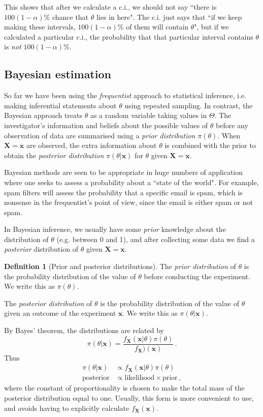 \documentclass[a4paper,11pt]{article}
\theoremstyle{definition}
\newtheorem*{defn}{Definition}
\numberwithin{equation}{section}
\begin{document}
This shows that after we calculate a c.i., we should not say ``there is $100(1-\alpha)\%$ chance that $\theta$ lies in here". The c.i. just says that ``if we keep making these intervals, $100(1-\alpha)\%$ of them will contain $\theta$", but if we calculated a particular c.i., the probability that that particular interval contains $\theta$ is \emph{not} $100(1-\alpha)\%$.

\subsection{Bayesian estimation}
So far we have been using the \emph{frequentist} approach to statistical inference, i.e. making inferential statements about $\theta$ using repeated sampling. In contrast, the Bayesian approach treats $\theta$ as a random variable taking values in $\Theta$. The investigator's information and beliefs about the possible values of $\theta$ before any observation of data are summarised using a \emph{prior distribution} $\pi(\theta)$. When $\mathbf{X}=\mathbf{x}$ are observed, the extra information about $\theta$ is combined with the prior to obtain the \emph{posterior distribution} $\pi(\theta|\mathbf{x})$ for $\theta$ given $\mathbf{X}=\mathbf{x}$.

Bayesian methods are seen to be appropriate in huge numbers of application where one seeks to assess a probability about a ``state of the world". For example, spam filters will assess the probability that a specific email is spam, which is nonsense in the frequentist's point of view, since the email is either spam or not spam.

In Bayesian inference, we usually have some \emph{prior} knowledge about the distribution of $\theta$ (e.g. between 0 and 1), and after collecting some data we find a \emph{posterior} distribution of $\theta$ given $\mathbf{X}=\mathbf{x}$.

\begin{defn}[Prior and posterior distributions]
The \emph{prior distribution} of $\theta$ is the probability distribution of the value of $\theta$ before conducting the experiment. We write this as $\pi(\theta)$.

The \emph{posterior distribution} of $\theta$ is the probability distribution of the value of $\theta$ given an outcome of the experiment $\mathbf{x}$. We write this as $\pi(\theta|\mathbf{x})$.
\end{defn}

By Bayes' theorem, the distributions are related by
\[
\pi(\theta|\mathbf{x})=\frac{f_\mathbf{X}(\mathbf{x}|\theta)\pi(\theta)}{f_\mathbf{X})(\mathbf{x})}\,.
\]
Thus
\begin{align*}
    \pi(\theta|\mathbf{x})&\propto f_\mathbf{X}(\mathbf{x}|\theta)\pi(\theta)\\
    \text{posterior}&\propto\text{likelihood}\times\text{prior}\,,
\end{align*}
where the constant of proportionality is chosen to make the total mass of the posterior distribution equal to one. Usually, this form is more convenient to use, and avoids having to explicitly calculate $f_\mathbf{X}(\mathbf{x})$.
\end{document}
